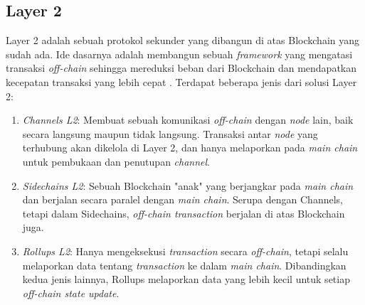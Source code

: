 \subsection{Layer 2}
\label{subsec:layer-2}

Layer 2 adalah sebuah protokol sekunder yang dibangun di atas Blockchain yang sudah ada. Ide dasarnya adalah membangun sebuah \textit{framework} yang mengatasi transaksi \textit{off-chain} sehingga mereduksi beban dari Blockchain dan mendapatkan kecepatan transaksi yang lebih cepat \parencite{sguanci2021layer}. Terdapat beberapa jenis dari solusi Layer 2:

\begin{enumerate}
	\item \textit{Channels L2}: Membuat sebuah komunikasi \textit{off-chain} dengan \textit{node} lain, baik secara langsung maupun tidak langsung. Transaksi antar \textit{node} yang terhubung akan dikelola di Layer 2, dan hanya melaporkan pada \textit{main chain} untuk pembukaan dan penutupan \textit{channel}.
	\item \textit{Sidechains L2}: Sebuah Blockchain "anak" yang berjangkar pada \textit{main chain} dan berjalan secara paralel dengan \textit{main chain}. Serupa dengan Channels, tetapi dalam Sidechains, \textit{off-chain transaction} berjalan di atas Blockchain juga.
	\item \textit{Rollups L2}: Hanya mengeksekusi \textit{transaction} secara \textit{off-chain}, tetapi selalu melaporkan data tentang \textit{transaction} ke dalam \textit{main chain}. Dibandingkan kedua jenis lainnya, Rollups melaporkan data yang lebih kecil untuk setiap \textit{off-chain state update}.
\end{enumerate}